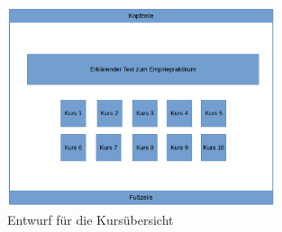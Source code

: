             \begin{figure}[t]
            	\centering
            	\includegraphics[width=0.7\textwidth]{./design/MockUpsFrontend/kursuebersicht.png}
            	\caption{Entwurf für die Kursübersicht}
            	\label{mockupCoursesFrontend}
            \end{figure}
            
